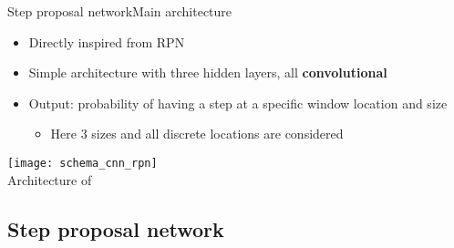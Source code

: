 
\begin{frame}{Step proposal network}{Main architecture}

\begin{itemize}
    \item Directly inspired from RPN
    \item Simple architecture with three hidden layers, all \textbf{convolutional}
    \item Output: probability of having a step at a specific window location and size
    \begin{itemize}
    \item Here 3 sizes and all discrete locations are considered
    \end{itemize}
\end{itemize}

    \begin{minipage}{\linewidth}
        \centering
        \texttt{[image: schema\_cnn\_rpn]}\\
        \smallskip
        {\small Architecture of \subalgo}
    \end{minipage}
    
\end{frame}

\subsection{Step proposal network}

